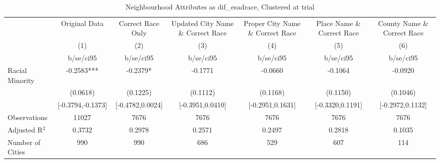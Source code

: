 \documentclass{article}
\begin{document}
\begin{table}[htbp]\centering
\def\sym#1{\ifmmode^{#1}\else\(^{#1}\)\fi}
\caption{Neighbourhood Attributes as dif\_esadrace, Clustered at trial}
\begin{tabular}{l*{6}{c}}
\toprule
                    &\multicolumn{1}{c}{Original Data}&\multicolumn{1}{c}{Correct Race Only}&\multicolumn{1}{c}{Updated City Name \& Correct Race}&\multicolumn{1}{c}{Proper City Name \& Correct Race}&\multicolumn{1}{c}{Place Name \& Correct Race}&\multicolumn{1}{c}{County Name \& Correct Race}\\\cmidrule(lr){2-2}\cmidrule(lr){3-3}\cmidrule(lr){4-4}\cmidrule(lr){5-5}\cmidrule(lr){6-6}\cmidrule(lr){7-7}
                    &\multicolumn{1}{c}{(1)}   &\multicolumn{1}{c}{(2)}   &\multicolumn{1}{c}{(3)}   &\multicolumn{1}{c}{(4)}   &\multicolumn{1}{c}{(5)}   &\multicolumn{1}{c}{(6)}   \\
                    &   b/se/ci95   &   b/se/ci95   &   b/se/ci95   &   b/se/ci95   &   b/se/ci95   &   b/se/ci95   \\
\midrule
Racial Minority     &     -0.2583***&     -0.2379*  &     -0.1771   &     -0.0660   &     -0.1064   &     -0.0920   \\
                    &    (0.0618)   &    (0.1225)   &    (0.1112)   &    (0.1168)   &    (0.1150)   &    (0.1046)   \\
                    &[-0.3794,-0.1373]   &[-0.4782,0.0024]   &[-0.3951,0.0410]   &[-0.2951,0.1631]   &[-0.3320,0.1191]   &[-0.2972,0.1132]   \\
\midrule
Observations        &       11027   &        7676   &        7676   &        7676   &        7676   &        7676   \\
Adjusted R$^2$      &      0.3732   &      0.2978   &      0.2571   &      0.2497   &      0.2818   &      0.1035   \\
Number of Cities    &         990   &         990   &         686   &         529   &         607   &         114   \\
\bottomrule
\end{tabular}
\end{table}
\end{document}
